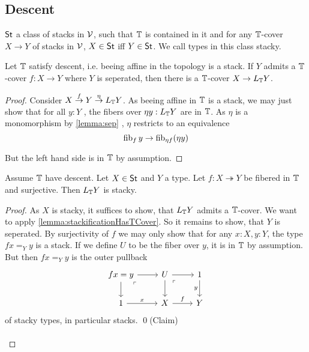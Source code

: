 
\subsection{Descent}
$\mathsf{St}$ a class of stacks in $\mathcal{V}$, such that $\mathbb{T}$ is contained in it and for any $\mathbb{T}$-cover $X \to Y$ of stacks in $\mathcal{V}$, $X \in \mathsf{St}$ iff $Y \in \mathsf{St}$. We call types in this class stacky.
\begin{lemma}{\label{lemma:stackificationHasTCover}}
	Let $\mathbb{T}$ satisfy descent, i.e. beeing affine in the topology is a stack. If $Y$ admits a $\mathbb{T}$-cover $f : X \to Y$ where $Y$ is seperated, then there is a $\mathbb{T}$-cover $X \to L_{\mathbb{T}} Y$.
\end{lemma}
\begin{proof}
	
	Consider $X \overset{f}{\to} Y \overset{\eta}{\to} L_{\mathbb{T}} Y$. As beeing affine in $\mathbb{T}$ is  a stack, we may just show that for all $y : Y$ , the fibers over $\eta y : L_{\mathbb{T}} Y$ are in $\mathbb{T}$. As $\eta$ is a monomorphism by \ref{lemma:sep} , $\eta$ restricts to an equivalence
	\[
	\operatorname{fib}_f y \to \operatorname{fib}_{ \eta f}(\eta y)
	\]
	
	But the left hand side is in $\mathbb{T}$ by assumption. 
\end{proof}
\begin{lemma}
	Assume $\mathbb{T}$ have descent.
	Let $X \in \mathsf{St}$ and $Y$ a type.	Let $f : X \twoheadrightarrow Y$ be fibered in $\mathbb{T}$ and surjective. Then $L_{\mathbb{T}} Y$ is stacky.
\end{lemma}
\begin{proof}
	As $X$ is stacky, it suffices to show, that $L_{\mathbb{T}} Y$ admits a $\mathbb{T}$-cover.
	We want to apply \ref{lemma:stackificationHasTCover}. So it remains to show, that $Y$ is seperated. By surjectivity of $f$ we may only show that for any $x : X, y : Y$, the type $f x =_Y y$ is a stack. If we define $U$ to be the fiber over $y$, it is in $\mathbb{T}$ by assumption. But then $f x =_Y y$ is the outer pullback
	\[\begin{tikzcd}
		{f x = y} & {U} & 1 \\
		\arrow["\ulcorner"{anchor=center, pos=0.125}, draw=none, from=1-1, to=2-2]
		1 & X & Y
		\arrow[from=1-1, to=1-2]
		\arrow[from=1-1, to=2-1]
		\arrow[from=1-2, to=1-3]
		\arrow[from=1-2, to=2-2]
		\arrow["\ulcorner"{anchor=center, pos=0.125}, draw=none, from=1-2, to=2-3]
		\arrow["y"', from=1-3, to=2-3]
		\arrow["x", from=2-1, to=2-2]
		\arrow["f", from=2-2, to=2-3]
	\end{tikzcd}\]
	of stacky types, in particular stacks. \qed(Claim) \\\\
	
\end{proof}
